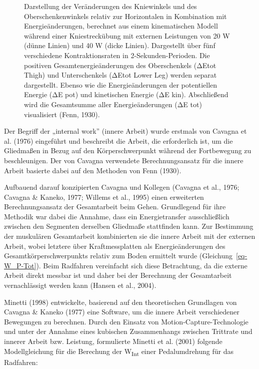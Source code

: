 \documentclass[
  letterpaper,
  DIV=11]{scrartcl}
\begin{document}
\begin{tcolorbox}
\begin{figure}[H]
{}

\caption{\label{fig-Fenn_WInt}Darstellung der Veränderungen des
Kniewinkels und des Oberschenkenwinkels relativ zur Horizontalen in
Kombination mit Energieänderungen, berechnet aus einem kinematischen
Modell während einer Kniestreckübung mit externen Leistungen von 20 W
(dünne Linien) und 40 W (dicke Linien). Dargestellt über fünf
verschiedene Kontraktionsraten in 2-Sekunden-Perioden. Die positiven
Gesamtenergieänderungen des Oberschenkels (ΔEtot Thigh) und
Unterschenkels (ΔEtot Lower Leg) werden separat dargestellt. Ebenso wie
die Energieänderungen der potentiellen Energie (ΔE pot) und kinetischen
Energie (ΔE kin). Abschließend wird die Gesamtsumme aller
Energieänderungen (ΔE tot) visualisiert (Fenn, 1930).}

\end{figure}%

\end{tcolorbox}

Der Begriff der „internal work'' (innere Arbeit) wurde erstmals von
Cavagna et al. (1976) eingeführt und beschreibt die Arbeit, die
erforderlich ist, um die Gliedmaßen in Bezug auf den Körperschwerpunkt
während der Fortbewegung zu beschleunigen. Der von Cavagna verwendete
Berechnungsansatz für die innere Arbeit basierte dabei auf den Methoden
von Fenn (1930).

Aufbauend darauf konzipierten Cavagna und Kollegen (Cavagna et al.,
1976; Cavagna \& Kaneko, 1977; Willems et al., 1995) einen erweiterten
Berechnungsansatz der Gesamtarbeit beim Gehen. Grundlegend für ihre
Methodik war dabei die Annahme, dass ein Energietransfer ausschließlich
zwischen den Segmenten derselben Gliedmaße stattfinden kann. Zur
Bestimmung der muskulären Gesamtarbeit kombinierten sie die innere
Arbeit mit der externen Arbeit, wobei letztere über Kraftmessplatten als
Energieänderungen des Gesamtkörperschwerpunkts relativ zum Boden
ermittelt wurde (Gleichung~\ref{eq-W_P-Tot}). Beim Radfahren vereinfacht
sich diese Betrachtung, da die externe Arbeit direkt messbar ist und
daher bei der Berechnung der Gesamtarbeit vernachlässigt werden kann
(Hansen et al., 2004).

Minetti (1998) entwickelte, basierend auf den theoretischen Grundlagen
von Cavagna \& Kaneko (1977) eine Software, um die innere Arbeit
verschiedener Bewegungen zu berechnen. Durch den Einsatz von
Motion-Capture-Technologie und unter der Annahme eines kubischen
Zusammenhangs zwischen Trittrate und innerer Arbeit bzw. Leistung,
formulierte Minetti et al. (2001) folgende Modellgleichung für die
Berechung der W\textsubscript{Int} einer Pedalumdrehung für das
Radfahren:
\end{document}
